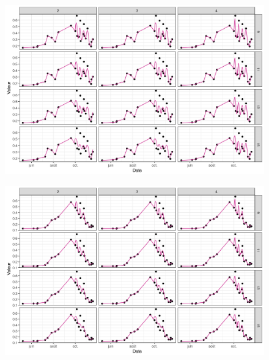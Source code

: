 \vspace{5mm}

\begin{figure}[htbp]
 \begin{center}
  \includegraphics[scale=0.7]{annexes/savgol_prs_1.png} 
 \end{center}
\end{figure}

\begin{figure}[htbp]
 \begin{center}
  \includegraphics[scale=0.7]{annexes/savgol_prs_2.png} 
 \end{center}
\end{figure}

